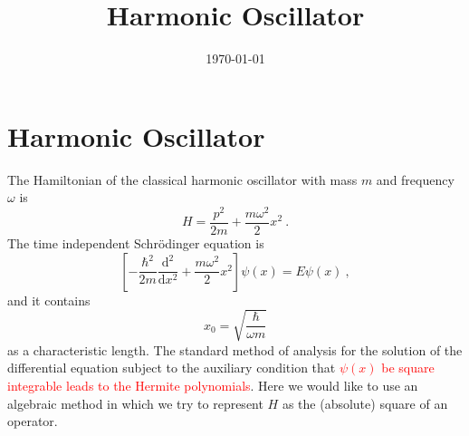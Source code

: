\documentclass[11pt,a4paper]{article}
\title{Harmonic Oscillator}
\author{}
\date{\today}
\newcommand{\dif}{\mathrm{d}}
\begin{document}
\maketitle

\section{Harmonic Oscillator}
\cite{schwabl2010quantum} The Hamiltonian of the classical harmonic oscillator with mass $m$ and frequency $\omega$ is
\begin{equation}
H = \dfrac{p^2}{2m} +\dfrac{m\omega^2}{2} x^2 ~.
\end{equation}
The time independent Schr\"odinger equation is
\begin{equation}
\left[-\dfrac{\hbar^2}{2m} \dfrac{\dif^2}{\dif x^2} + \dfrac{m\omega^2}{2} x^2 \right] \psi(x) = E \psi(x) ~,
\end{equation}
and it contains
\begin{equation}
x_0 = \sqrt{\dfrac{\hbar}{\omega m}}
\end{equation}
as a characteristic length. The standard method of analysis for the solution of the differential equation subject to the auxiliary condition that \textcolor{red}{$\psi(x)$ be square integrable leads to the Hermite polynomials}. Here we
would like to use an algebraic method in which we try to represent $H$ as the (absolute) square of an operator. 
\end{document}
